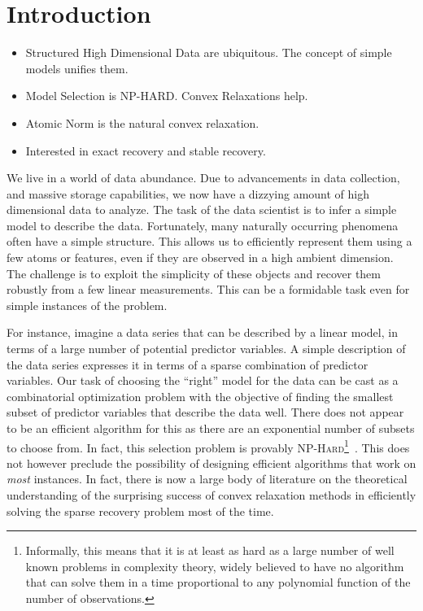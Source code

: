 \chapter{Introduction}

\begin{itemize}
  \item Structured High Dimensional Data are ubiquitous. The concept of simple models unifies them.
  \item Model Selection is NP-HARD. Convex Relaxations help.
  \item Atomic Norm is the natural convex relaxation.
  \item Interested in exact recovery and stable recovery.
\end{itemize}

We live in a world of data abundance. Due to advancements in data collection,
and massive storage capabilities, we now have a dizzying amount of high
dimensional data to analyze. The task of the data scientist is to infer a
simple model to describe the data. Fortunately, many naturally occurring
phenomena often have a simple structure. This allows us to efficiently
represent them using a few atoms or features, even if they are observed in a
high ambient dimension. The challenge is to exploit the simplicity of these
objects and recover them robustly from a few linear measurements. This can be a
formidable task even for simple instances of the problem.


For instance, imagine a data series that can be described by a linear model, in
terms of a large number of potential predictor variables. A simple description
of the data series expresses it in terms of a sparse combination of predictor
variables. Our task of choosing the ``right'' model for the data can be cast as
a combinatorial optimization problem with the objective of finding the smallest
subset of predictor variables that describe the data well. There does not
appear to be an efficient algorithm for this as there are an exponential number
of subsets to choose from. In fact, this selection problem is provably
\textsc{NP-Hard}\footnote{Informally, this means that it is at least as hard as
a large number of well known problems in complexity theory, widely believed to
have no algorithm that can solve them in a time proportional to any polynomial
function of the number of observations.}~\cite{Natarajan95}. This does not
however preclude the possibility of designing efficient algorithms that work on
\emph{most} instances. In fact, there is now a large body of literature on the
theoretical understanding of the surprising success of convex relaxation
methods in efficiently solving the sparse recovery problem most of the time.

